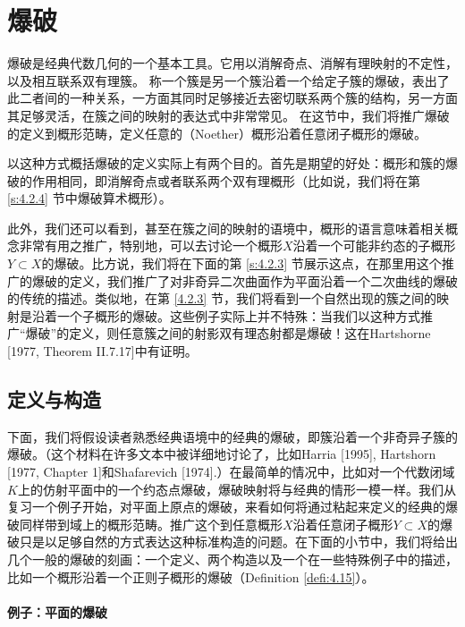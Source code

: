 \section{爆破}\label{s:4.2}

爆破是经典代数几何的一个基本工具。它用以消解奇点、消解有理映射的不定性，以及相互联系双有理簇。
称一个簇是另一个簇沿着一个给定子簇的爆破，表出了此二者间的一种关系，一方面其同时足够接近去密切联系两个簇的结构，另一方面其足够灵活，在簇之间的映射的表达式中非常常见。
在这节中，我们将推广爆破的定义到概形范畴，定义任意的（Noether）概形沿着任意闭子概形的爆破。

以这种方式概括爆破的定义实际上有两个目的。首先是期望的好处：概形和簇的爆破的作用相同，即消解奇点或者联系两个双有理概形（比如说，我们将在第 \ref{s:4.2.4} 节中爆破算术概形）。

此外，我们还可以看到，甚至在簇之间的映射的语境中，概形的语言意味着相关概念非常有用之推广，特别地，可以去讨论一个概形$X$沿着一个可能非约态的子概形$Y\subset X$的爆破。比方说，我们将在下面的第 \ref{s:4.2.3} 节展示这点，在那里用这个推广的爆破的定义，我们推广了对非奇异二次曲面作为平面沿着一个二次曲线的爆破的传统的描述。类似地，在第 \ref{4.2.3} 节，我们将看到一个自然出现的簇之间的映射是沿着一个子概形的爆破。这些例子实际上并不特殊：当我们以这种方式推广“爆破”的定义，则任意簇之间的射影双有理态射都是爆破！这在Hartshorne [1977, Theorem II.7.17]中有证明。

\subsection{定义与构造}\label{s:4.2.1}


下面，我们将假设读者熟悉经典语境中的经典的爆破，即簇沿着一个非奇异子簇的爆破。（这个材料在许多文本中被详细地讨论了，比如Harria [1995], Hartshorn [1977, Chapter 1]和Shafarevich [1974].）在最简单的情况中，比如对一个代数闭域$K$上的仿射平面中的一个约态点爆破，爆破映射将与经典的情形一模一样。我们从复习一个例子开始，对平面上原点的爆破，来看如何将通过粘起来定义的经典的爆破同样带到域上的概形范畴。推广这个到任意概形$X$沿着任意闭子概形$Y\subset X$的爆破只是以足够自然的方式表达这种标准构造的问题。在下面的小节中，我们将给出几个一般的爆破的刻画：一个定义、两个构造以及一个在一些特殊例子中的描述，比如一个概形沿着一个正则子概形的爆破（Definition \ref{defi:4.15}）。

\paragraph*{例子：平面的爆破}

